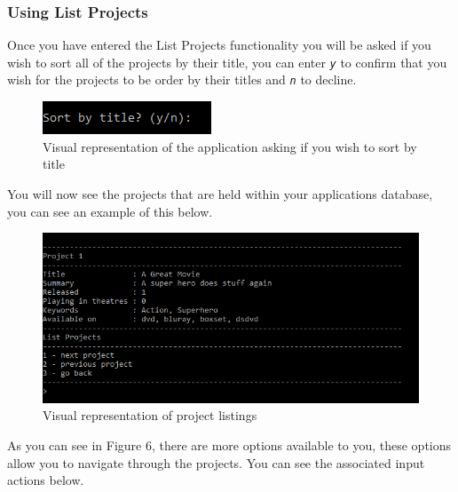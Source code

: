 \documentclass[
  english,
  a4paper,
,tablecaptionabove
]{scrartcl}
\begin{document}
\newpage

\hypertarget{using-list-projects}{%
\subsubsection{Using List Projects}\label{using-list-projects}}

Once you have entered the List Projects functionality you will be asked
if you wish to sort all of the projects by their title, you can enter
\emph{\texttt{y}} to confirm that you wish for the projects to be order
by their titles and \emph{\texttt{n}} to decline.

\begin{figure}
\centering
\includegraphics{images/user-guide/view-mode/sort-by-title.png}
\caption{Visual representation of the application asking if you wish to
sort by title}
\end{figure}

You will now see the projects that are held within your applications
database, you can see an example of this below.

\begin{figure}
\centering
\includegraphics{images/user-guide/view-mode/listed-projects.png}
\caption{Visual representation of project listings}
\end{figure}

As you can see in Figure 6, there are more options available to you,
these options allow you to navigate through the projects. You can see
the associated input actions below.
\end{document}
